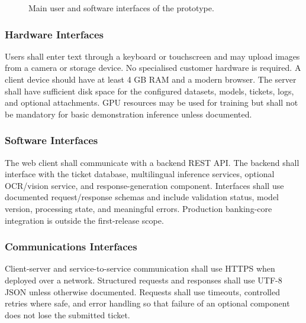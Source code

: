 \documentclass[10pt,letterpaper]{article}
\newenvironment{templatebody}{\par\justifying\setlength{\emergencystretch}{3em}}{\par}
\begin{document}
\begin{templatebody}
\begin{figure}[H]
{}
\caption{Main user and software interfaces of the prototype.}
\label{fig:interface-flow}
\end{figure}

\subsubsection{Hardware Interfaces}
Users shall enter text through a keyboard or touchscreen and may upload images from a camera or storage device. No specialised customer hardware is required. A client device should have at least 4 GB RAM and a modern browser. The server shall have sufficient disk space for the configured datasets, models, tickets, logs, and optional attachments. GPU resources may be used for training but shall not be mandatory for basic demonstration inference unless documented.

\subsubsection{Software Interfaces}
The web client shall communicate with a backend REST API. The backend shall interface with the ticket database, multilingual inference services, optional OCR/vision service, and response-generation component. Interfaces shall use documented request/response schemas and include validation status, model version, processing state, and meaningful errors. Production banking-core integration is outside the first-release scope.

\subsubsection{Communications Interfaces}
Client-server and service-to-service communication shall use HTTPS when deployed over a network. Structured requests and responses shall use UTF-8 JSON unless otherwise documented. Requests shall use timeouts, controlled retries where safe, and error handling so that failure of an optional component does not lose the submitted ticket.


\end{templatebody}
\end{document}
